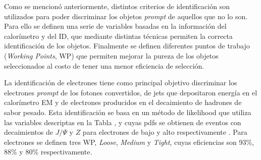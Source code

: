 Como se mencionó anteriormente, distintos criterios de identificación son utilizados para poder discriminar los objetos \textit{prompt} de aquellos que no lo son. Para ello se definen una serie de variables basadas en la información del calorímetro y del ID, que mediante distintas técnicas permiten la correcta identificación de los objetos. Finalmente se definen diferentes puntos de trabajo (\textit{Working Points}, WP) que permiten mejorar la pureza de los objetos seleccionados al costo de tener una menor eficiencia de selección.

La identificación de electrones tiene como principal objetivo discriminar los electrones \textit{prompt} de los fotones convertidos, de jets que depositaron energía en el calorímetro EM y de electrones producidos en el decaimiento de hadrones de sabor pesado. Esta identificación se basa en un método de likelihood que utiliza las variables descriptas en la Tabla , y cuyas pdfs se obtienen de eventos con decaimientos de $J/\Psi$ y $Z$ para electrones de bajo y alto \ET respectivamente \cite{PERF-2016-01}. Para electrones se definen tres WP, \textit{Loose}, \textit{Medium} y \textit{Tight}, cuyas eficiencias son  93\%, 88\% y 80\% respectivamente. 

